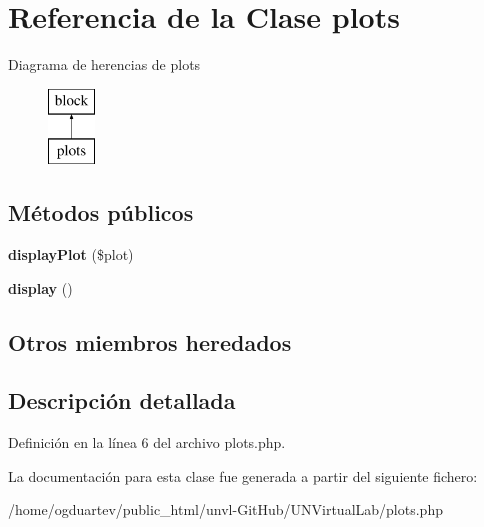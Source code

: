 \hypertarget{classplots}{}\section{Referencia de la Clase plots}
\label{classplots}
Diagrama de herencias de plots\begin{figure}[H]
\begin{center}
\leavevmode
\includegraphics[height=2.000000cm]{classplots}
\end{center}
\end{figure}
\subsection*{Métodos públicos}
\begin{DoxyCompactItemize}
\item 
\mbox{\label{classplots_a2bbdf8344df94f2b1cfb51d6144d95f7}} 
{\bfseries display\+Plot} (\$plot)
\item 
\mbox{\label{classplots_a96aa342680d985e274c53cddd3e39978}} 
{\bfseries display} ()
\end{DoxyCompactItemize}
\subsection*{Otros miembros heredados}


\subsection{Descripción detallada}


Definición en la línea 6 del archivo plots.\+php.



La documentación para esta clase fue generada a partir del siguiente fichero\+:\begin{DoxyCompactItemize}
\item 
/home/ogduartev/public\+\_\+html/unvl-\/\+Git\+Hub/\+U\+N\+Virtual\+Lab/plots.\+php\end{DoxyCompactItemize}

